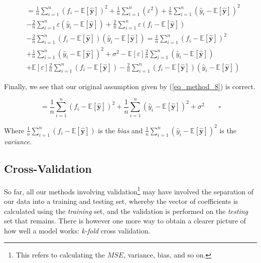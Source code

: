\documentclass[a4paper,10pt,english]{article}
\begin{document}
\begin{align*}	
&= \frac{1}{n} \sum_{i=1}^{n} ( f_i - \mathbb{E}[\hat{\mathbf{y}}] )^2 
+ \frac{1}{n} \sum_{i=1}^{n} ( \varepsilon^2 )
+ \frac{1}{n} \sum_{i=1}^{n} ( \hat{y}_i - \mathbb{E}[\hat{\mathbf{y}}] )^2 
\\&- \frac{2}{n} \sum_{i=1}^{n} \varepsilon ( \hat{y}_i - \mathbb{E}[\hat{\mathbf{y}}] )
+ \frac{2}{n} \sum_{i=1}^{n} \varepsilon ( f_i - \mathbb{E}[\hat{\mathbf{y}}] )
\\&- \frac{2}{n} \sum_{i=1}^{n} ( f_i - \mathbb{E}[\hat{\mathbf{y}}] ) ( \hat{y}_i - \mathbb{E}[\hat{\mathbf{y}}] )
= \frac{1}{n} \sum_{i=1}^{n} ( f_i - \mathbb{E}[\hat{\mathbf{y}}] )^2 
\\&+ \frac{1}{n} \sum_{i=1}^{n} ( \hat{y}_i - \mathbb{E}[\hat{\mathbf{y}}] )^2 
+ \sigma^2
- \mathbb{E}[\varepsilon] \frac{2}{n} \sum_{i=1}^{n} ( \hat{y}_i - \mathbb{E}[\hat{\mathbf{y}}] )
\\&+ \mathbb{E}[\varepsilon] \frac{2}{n} \sum_{i=1}^{n} ( f_i - \mathbb{E}[\hat{\mathbf{y}}] )
-\frac{2}{n} \sum_{i=1}^{n} ( f_i - \mathbb{E}[\hat{\mathbf{y}}] ) ( \hat{y}_i - \mathbb{E}[\hat{\mathbf{y}}] )
\end{align*}

Finally, we see that our original assumption given by (\ref{eq_method_8}) is correct.

\begin{equation*}
= \frac{1}{n} \sum_{i=1}^{n} ( f_i - \mathbb{E}[\hat{\mathbf{y}}] )^2 
+ \frac{1}{n} \sum_{i=1}^{n} ( \hat{y}_i - \mathbb{E}[\hat{\mathbf{y}}] )^2 
+ \sigma^2 \qquad \square
\end{equation*}

Where $\frac{1}{n} \sum_{i=1}^{n} ( f_i - \mathbb{E}[\hat{\mathbf{y}}] )$ is the \textit{bias} and
$\frac{1}{n} \sum_{i=1}^{n} ( \hat{y}_i - \mathbb{E}[\hat{\mathbf{y}}] )^2$ is the \textit{variance}.	

\subsection*{Cross-Validation}

So far, all our methods involving validation\footnote{This refers to calculating the $MSE$, variance, bias, and so on.} may have involved the separation of our data into a training and testing set, whereby the vector of coefficients is calculated using the \textit{training} set, and the validation is performed on the \textit{testing} set that remains.	There is however one more way to obtain a clearer picture of how well a model works: \textit{k-fold} cross validation.	
\end{document}
